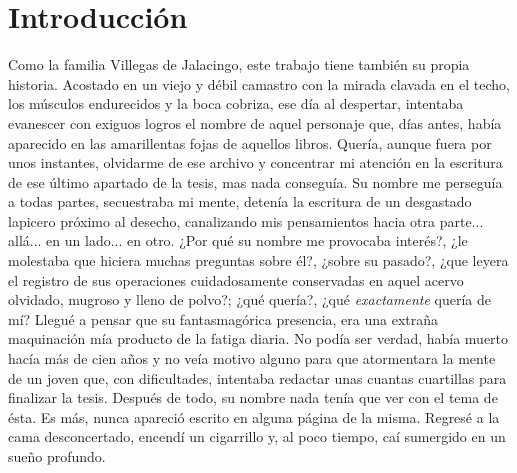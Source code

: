 \documentclass[14pt,twoside,final]{extbook} %
\begin{document}
\chapter*{Introducción}
\label{ch:introduccion}
\pagestyle{empty}
\thispagestyle{empty}
\pagestyle{fancy}
\fancyhf{} %
\fancyhead[RO,LE]{\thepage}
\renewcommand{\headrulewidth}{0pt}
Como la familia Villegas de Jalacingo, este trabajo tiene también su propia historia. Acostado en un viejo y débil camastro con la mirada clavada en el techo, los músculos endurecidos y la boca cobriza, ese día al despertar, intentaba evanescer con exiguos logros el nombre de aquel personaje que, días antes, había aparecido en las amarillentas fojas de aquellos libros. Quería, aunque fuera por unos instantes, olvidarme de ese archivo y concentrar mi atención en la escritura de ese último apartado de la tesis, mas nada conseguía. Su nombre me perseguía a todas partes, secuestraba mi mente, detenía la escritura de un desgastado lapicero próximo al desecho, canalizando mis pensamientos hacia otra parte... allá... en un lado... en otro. ¿Por qué su nombre me provocaba interés?, ¿le molestaba que hiciera muchas preguntas sobre él?, ¿sobre su pasado?, ¿que leyera el registro de sus operaciones cuidadosamente conservadas en aquel acervo olvidado, mugroso y lleno de polvo?; ¿qué quería?, ¿qué \emph{exactamente} quería de mí? Llegué a pensar que su fantasmagórica presencia, era una extraña maquinación mía producto de la fatiga diaria. No podía ser verdad, había muerto hacía más de cien años y no veía motivo alguno para que atormentara la mente de un joven que, con dificultades, intentaba redactar unas cuantas cuartillas para finalizar la tesis. Después de todo, su nombre nada tenía que ver con el tema de ésta. Es más, nunca apareció escrito en alguna página de la misma. Regresé a la cama desconcertado, encendí un cigarrillo y, al poco tiempo, caí sumergido en un sueño profundo.
\end{document}
